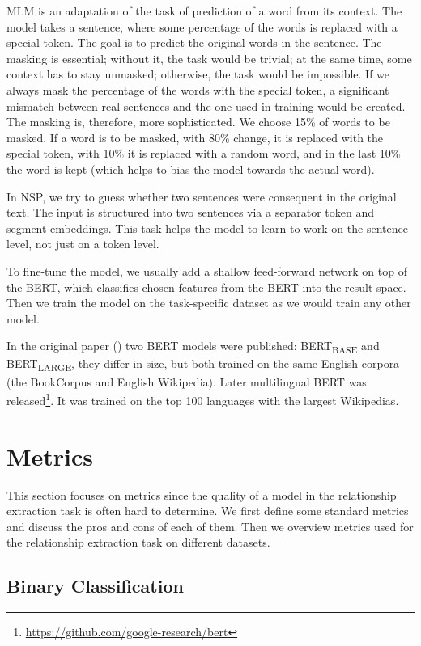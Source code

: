 MLM is an adaptation of the task of prediction of a word from its context. The model takes a sentence, where some percentage of the words is replaced with a special token. The goal is to predict the original words in the sentence. The masking is essential; without it, the task would be trivial; at the same time, some context has to stay unmasked; otherwise, the task would be impossible. If we always mask the percentage of the words with the special token, a significant mismatch between real sentences and the one used in training would be created. The masking is, therefore, more sophisticated. We choose 15\% of words to be masked. If a word is to be masked, with 80\% change, it is replaced with the special token, with 10\% it is replaced with a random word, and in the last 10\% the word is kept (which helps to bias the model towards the actual word).

In NSP, we try to guess whether two sentences were consequent in the original text. The input is structured into two sentences via a separator token and segment embeddings. This task helps the model to learn to work on the sentence level, not just on a token level.

To fine-tune the model, we usually add a shallow feed-forward network on top of the BERT, which classifies chosen features from the BERT into the result space. Then we train the model on the task-specific dataset as we would train any other model.

In the original paper (\cite{bert}) two BERT models were published: BERT\textsubscript{BASE} and BERT\textsubscript{LARGE}, they differ in size, but both trained on the same English corpora (the BookCorpus and English Wikipedia). Later multilingual BERT was released\footnote{\url{https://github.com/google-research/bert}}. It was trained on the top 100 languages with the largest Wikipedias.


\section{Metrics}
This section focuses on metrics since the quality of a model in the relationship extraction task is often hard to determine. We first define some standard metrics and discuss the pros and cons of each of them. Then we overview metrics used for the relationship extraction task on different datasets.

\subsection{Binary Classification}

